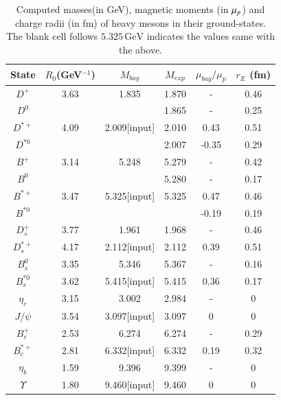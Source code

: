 \documentclass[12pt,prd,onecolumn,floatfix,nofootinbib]{revtex4}
\begin{document}
\renewcommand{\tabcolsep}{0.3cm} \renewcommand{\arraystretch}{1.1}
\begin{table}[!htb]
\caption{Computed masses(in GeV), magnetic moments (in $\protect\mu_{p}$)
and charge radii (in fm) of heavy mesons in their ground-states. The blank
cell follows $5.325\,\mathrm{GeV}$ indicates the values same with the above.}
\label{tab:heavymeson}%
\begin{tabular}{cccccc}
\hline\hline
\textrm{State} & $R_{0}$(GeV$^{-1}$) & $M_{bag}$ & $M_{exp}$ \cite{Tanabashi:D18}
& $\mu_{bag}/\mu_{p}$ & $r_{E}$ (fm) \\ \hline
$D^{+}$ & 3.63 & 1.835 & 1.870 & - & 0.46 \\
$D^{0}$ &  &  & 1.865 & - & 0.25 \\
$D^{\ast +}$ & 4.09 & 2.009[input] & 2.010 & 0.43 & 0.51 \\
$D^{\ast 0}$ &  &  & 2.007 & -0.35 & 0.29 \\
$B^{+}$ & 3.14 & 5.248 & 5.279 & - & 0.42 \\
$B^{0}$ &  &  & 5.280 & - & 0.17 \\
$B^{\ast +}$ & 3.47 & 5.325[input] & 5.325 & 0.47 & 0.46 \\
$B^{\ast 0}$ &  &  &  & -0.19 & 0.19 \\
$D_{s}^{+}$ & 3.77 & 1.961 & 1.968 & - & 0.46 \\
$D_{s}^{\ast +}$ & 4.17 & 2.112[input] & 2.112 & 0.39 & 0.51 \\
$B_{s}^{0}$ & 3.35 & 5.346 & 5.367 & - & 0.16 \\
$B_{s}^{\ast 0}$ & 3.62 & 5.415[input] & 5.415 & 0.36 & 0.17 \\
$\eta_{c}$ & 3.15 & 3.002 & 2.984 & - & 0 \\
$J/\psi$ & 3.54 & 3.097[input] & 3.097 & 0 & 0 \\
$B_{c}^{+}$ & 2.53 & 6.274 & 6.274 & - & 0.29 \\
$B_{c}^{\ast +}$ & 2.81 & 6.332[input] & 6.332 & 0.19 & 0.32 \\
$\eta_{b}$ & 1.59 & 9.396 & 9.399 & - & 0 \\
$\Upsilon$ & 1.80 & 9.460[input] & 9.460 & 0 & 0 \\ \hline\hline
\end{tabular}%
\end{table}
\end{document}
